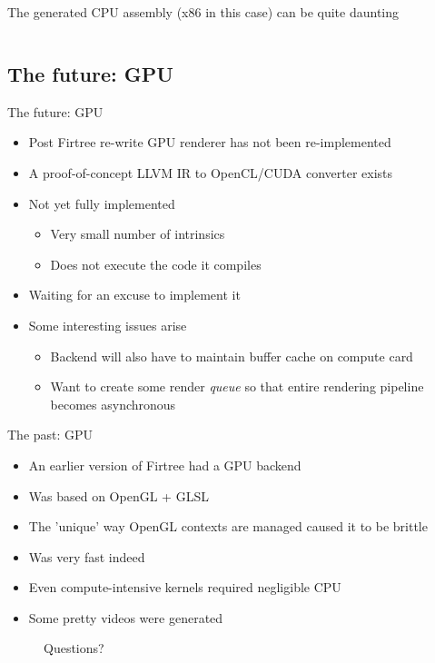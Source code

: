 \documentclass{beamer}
\newcommand{\bi}{\begin{itemize}}
\newcommand{\ei}{\end{itemize}}
\begin{document}
\begin{frame}
  The generated CPU assembly (x86 in this case) can be quite daunting
  \vfill
  \begin{columns}
    \scalebox{0.3}{}
    \scalebox{0.3}{}
    \scalebox{0.3}{}
  \end{columns}
\end{frame}


\subsection{The future: GPU} %

\begin{frame}{The future: GPU}
  \bi
    \item Post Firtree re-write GPU renderer has not been re-implemented
    \item A proof-of-concept LLVM IR to OpenCL/CUDA converter exists
    \item Not yet fully implemented
    \bi
      \item Very small number of intrinsics
      \item Does not execute the code it compiles
    \ei
    \item Waiting for an excuse to implement it
    \item Some interesting issues arise
    \bi
      \item Backend will also have to maintain buffer cache on compute card
      \item Want to create some render \emph{queue} so that entire rendering
      pipeline becomes asynchronous
    \ei
  \ei
\end{frame}

\begin{frame}{The past: GPU}
  \bi
    \item An earlier version of Firtree had a GPU backend
    \item Was based on OpenGL + GLSL
    \item The 'unique' way OpenGL contexts are managed caused it to be brittle
    \item Was very fast indeed
    \item Even compute-intensive kernels required negligible CPU
    \item Some pretty videos were generated
  \ei
\end{frame}


\begin{frame}
  \begin{figure}\begin{centering} 
    \Huge Questions?
  \end{centering}\end{figure}
\end{frame}
\end{document}
